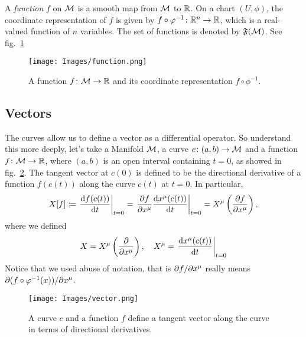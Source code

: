 \begin{definition}[Function]
    A \emph{function} $f$ on $\mathcal{M}$ is a smooth map from $\mathcal{M}$ to $\mathbb{R}$. On a chart $(U,\phi)$, the coordinate representation of $f$ is given by $f \circ \varphi^{-1} \colon \mathbb{R}^n \to \mathbb{R}$, which is a real-valued function of $n$ variables. The set of functions is denoted by $\mathfrak{F}(\mathcal{M})$. See fig.~\ref{fig:function}
\end{definition}

\begin{figure}
    \centering
    \texttt{[image: Images/function.png]}
    \caption{A function $f\colon \mathcal{M} \to \mathbb{R}$ and its coordinate representation $f \circ \phi^{-1}$.}
    \label{fig:function}
\end{figure}

\subsection{Vectors}
The curves allow us to define a vector as a differential operator. So understand this more deeply, let's take a Manifold $\mathcal{M}$, a curve $c\colon (a,b) \to \mathcal{M}$ and a function $f \colon \mathcal{M} \to \mathbb{R}$, where $(a,b)$ is an open interval containing $t=0$, as showed in fig.~\ref{fig:vector}. The tangent vector at $c(0)$ is defined to be the directional derivative of a function $f(c(t))$ along the curve $c(t)$ at $t=0$. In particular,
\begin{equation}
    X[f] \coloneq \left. \frac{\mathop{}\!\mathrm{d} f (c(t))}{\mathop{}\!\mathrm{d} t}\right|_{t=0} = \left. \frac{\partial f}{\partial x^\mu} \frac{\mathop{}\!\mathrm{d} x^\mu(c(t))}{\mathop{}\!\mathrm{d} t} \right|_{t=0} = X^\mu \left(\frac{\partial f}{\partial x^\mu}\right),
\end{equation}
where we defined
\begin{equation}\label{eq:def-vectors}
    X = X^\mu \left(\frac{\partial}{\partial x^\mu}\right), \quad X^\mu = \left. \frac{\mathop{}\!\mathrm{d} x^\mu(c(t))}{\mathop{}\!\mathrm{d} t} \right|_{t=0}
\end{equation}
Notice that we used abuse of notation, that is $\partial f / \partial x^\mu$ really means $\partial (f \circ \varphi^{-1}(x))/\partial x^\mu$.

\begin{figure}
    \centering
    \texttt{[image: Images/vector.png]}
    \caption{A curve $c$ and a function $f$ define a tangent vector along the curve in terms of directional derivatives.}
    \label{fig:vector}
\end{figure}


